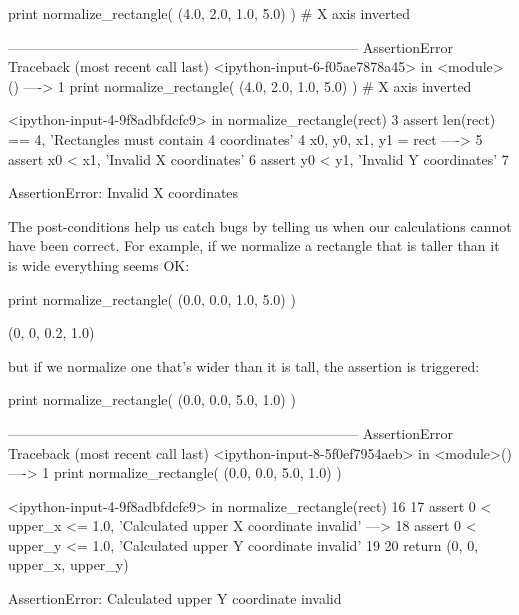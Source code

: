\begin{VerbIn}
print normalize_rectangle( (4.0, 2.0, 1.0, 5.0) ) # X axis inverted
\end{VerbIn}

\begin{VerbErr}
---------------------------------------------------------------------------
AssertionError                            Traceback (most recent call last)
<ipython-input-6-f05ae7878a45> in <module>()
----> 1 print normalize_rectangle( (4.0, 2.0, 1.0, 5.0) ) # X axis inverted

<ipython-input-4-9f8adbfdcfc9> in normalize_rectangle(rect)
      3     assert len(rect) == 4, 'Rectangles must contain 4 coordinates'
      4     x0, y0, x1, y1 = rect
----> 5     assert x0 < x1, 'Invalid X coordinates'
      6     assert y0 < y1, 'Invalid Y coordinates'
      7

AssertionError: Invalid X coordinates
\end{VerbErr}

The post-conditions help us catch bugs by telling us when our
calculations cannot have been correct. For example, if we normalize a
rectangle that is taller than it is wide everything seems OK:

\begin{VerbIn}
print normalize_rectangle( (0.0, 0.0, 1.0, 5.0) )
\end{VerbIn}

\begin{VerbOut}
(0, 0, 0.2, 1.0)
\end{VerbOut}

but if we normalize one that's wider than it is tall, the assertion is
triggered:

\begin{VerbIn}
print normalize_rectangle( (0.0, 0.0, 5.0, 1.0) )
\end{VerbIn}

\begin{VerbErr}
---------------------------------------------------------------------------
AssertionError                            Traceback (most recent call last)
<ipython-input-8-5f0ef7954aeb> in <module>()
----> 1 print normalize_rectangle( (0.0, 0.0, 5.0, 1.0) )

<ipython-input-4-9f8adbfdcfc9> in normalize_rectangle(rect)
     16
     17     assert 0 < upper_x <= 1.0, 'Calculated upper X coordinate invalid'
---> 18     assert 0 < upper_y <= 1.0, 'Calculated upper Y coordinate invalid'
     19
     20     return (0, 0, upper_x, upper_y)

AssertionError: Calculated upper Y coordinate invalid
\end{VerbErr}

